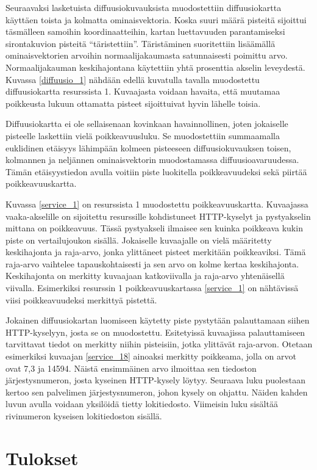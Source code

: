 Seuraavaksi lasketuista diffuusiokuvauksista muodostettiin
diffuusiokartta käyttäen toista ja kolmatta ominaisvektoria. Koska
suuri määrä pisteitä sijoittui täsmälleen samoihin koordinaatteihin,
kartan luettavuuden parantamiseksi sirontakuvion pisteitä
``täristettiin''. Täristäminen suoritettiin lisäämällä
ominaisvektorien arvoihin normaalijakaumasta satunnaisesti poimittu
arvo. Normaalijakauman keskihajontana käytettiin yhtä prosenttia
akselin leveydestä. Kuvassa \ref{diffuusio_1} nähdään edellä kuvatulla
tavalla muodostettu diffuusiokartta resurssista 1. Kuvaajasta voidaan
havaita, että muutamaa poikkeusta lukuun ottamatta pisteet sijoittuivat
hyvin lähelle toisia.

Diffuusiokartta ei ole sellaisenaan kovinkaan havainnollinen, joten
jokaiselle pisteelle laskettiin vielä poikkeavuusluku. Se muodostettiin
summaamalla euklidinen etäisyys lähimpään kolmeen pisteeseen
diffuusiokuvauksen toisen, kolmannen ja neljännen ominaisvektorin
muodostamassa diffuusioavaruudessa. Tämän etäisyystiedon avulla voitiin piste
luokitella poikkeavuudeksi sekä piirtää poikkeavuuskartta.

Kuvassa \ref{service_1} on resurssista 1 muodostettu poikkeavuuskartta. Kuvaajassa vaaka-akselille on sijoitettu resurssille kohdistuneet HTTP-kyselyt
ja pystyakselin mittana on poikkeavuus. Tässä pystyakseli ilmaisee sen kuinka poikkeava kukin piste on vertailujoukon sisällä. Jokaiselle kuvaajalle
on vielä määritetty keskihajonta ja raja-arvo, jonka ylittäneet pisteet merkitään poikkeaviksi. Tämä raja-arvo vaihtelee tapauskohtaisesti ja sen
arvo on kolme kertaa keskihajonta. Keskihajonta on merkitty kuvaajaan katkoviivalla ja raja-arvo yhtenäisellä viivalla. Esimerkiksi resurssin 1 
poikkeavuuskartassa \ref{service_1} on nähtävissä viisi poikkeavuudeksi merkittyä pistettä.

Jokainen diffuusiokartan luomiseen käytetty piste pystytään
palauttamaan siihen HTTP-kyselyyn, josta se on
muodostettu. Esitetyissä kuvaajissa palauttamiseen tarvittavat tiedot
on merkitty niihin pisteisiin, jotka ylittävät raja-arvon. Otetaan
esimerkiksi kuvaajan \ref{service_18} ainoaksi merkitty poikkeama,
jolla on arvot ovat 7,3 ja 14594. Näistä ensimmäinen arvo ilmoittaa
sen tiedoston järjestysnumeron, josta kyseinen HTTP-kysely
löytyy. Seuraava luku puolestaan kertoo sen palvelimen
järjestysnumeron, johon kysely on ohjattu. Näiden kahden luvun avulla
voidaan yksilöidä tietty lokitiedosto. Viimeisin luku sisältää
rivinumeron kyseisen lokitiedoston sisällä.

\section{Tulokset}

